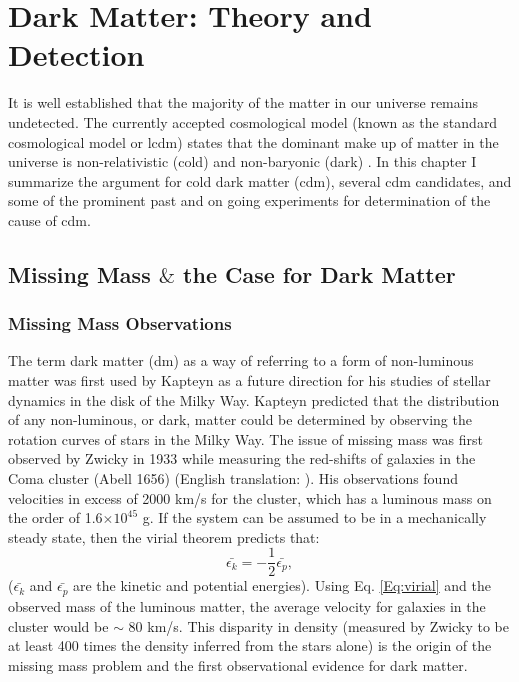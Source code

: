 \chapter{Dark Matter: Theory and Detection}
It is well established that the majority of the matter in our universe remains undetected. The currently accepted cosmological model (known as the standard cosmological model or \gls{lcdm}) states that the dominant make up of matter in the universe is non-relativistic (cold) and non-baryonic (dark) \cite{wmap9Year}. In this chapter I summarize the argument for cold dark matter (\gls{cdm}), several \gls{cdm} candidates, and some of the prominent past and on going experiments for determination of the cause of \gls{cdm}. 
\section{Missing Mass $\&$ the Case for Dark Matter} 
\subsection{Missing Mass Observations}

\indent The term dark matter (\gls{dm}) as a way of referring to a form of non-luminous matter was first used by Kapteyn \cite{kapteynSidereelAndDM} as a future direction for his studies of stellar dynamics in the disk of the Milky Way. Kapteyn predicted that the distribution of any non-luminous, or dark, matter could be determined by observing the rotation curves of stars in the Milky Way. The issue of missing mass was first observed by Zwicky in 1933 while measuring the red-shifts of galaxies in the Coma cluster (Abell 1656) \cite{zwicky1933redshiftGerman} (English translation: \cite{zwicky1933redshiftEnglish}). His observations found velocities in excess of 2000 km/s for the cluster, which has a luminous mass on the order of 1.6$\times 10^{45}$ g. If the system can be assumed to be in a mechanically steady state, then the virial theorem predicts that:
\begin{equation}
\bar{\epsilon_{k}} = -\frac{1}{2}\bar{\epsilon_{p}},
\label{Eq:virial}
\end{equation}
($\bar{\epsilon_{k}}$ and $\bar{\epsilon_{p}}$ are the kinetic and potential energies). Using Eq. \eqref{Eq:virial} and the observed mass of the luminous matter, the average velocity for galaxies in the cluster would be $\sim$ 80 km/s. This disparity in density (measured by Zwicky to be at least 400 times the density inferred from the stars alone) is the origin of the missing mass problem and the first observational evidence for dark matter.

